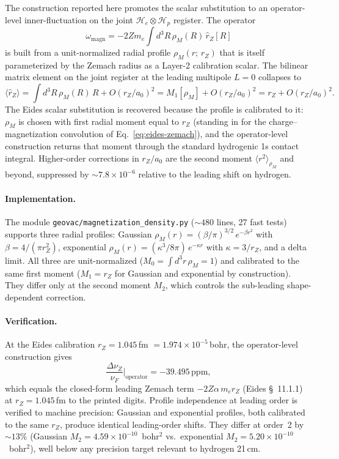 \documentclass[twocolumn,prc,amsmath,amssymb,superscriptaddress]{revtex4-2}
\begin{document}
The construction reported here promotes the scalar substitution to an
operator-level inner-fluctuation on the joint
$\mathcal{H}_e \otimes \mathcal{H}_p$ register. The operator
\begin{equation}
  \omega_{\mathrm{magn}}
  = -2 Z m_e \int d^3 R\, \rho_M(R)\, \hat r_Z[R]
\end{equation}
is built from a unit-normalized radial profile $\rho_M(r;\,r_Z)$ that
is itself parameterized by the Zemach radius as a Layer-2 calibration
scalar. The bilinear matrix element on the joint register at the
leading multipole $L = 0$ collapses to
\begin{equation}
  \langle \hat r_Z \rangle
  = \int d^3 R\,\rho_M(R)\, R + O(r_Z/a_0)^2
  = M_1[\rho_M] + O(r_Z/a_0)^2
  = r_Z + O(r_Z/a_0)^2.
\label{eq:rZ-collapse}
\end{equation}
The Eides scalar substitution is recovered because the profile is
calibrated to it:\ $\rho_M$ is chosen with first radial moment equal to
$r_Z$ (standing in for the charge--magnetization convolution of
Eq.~\eqref{eq:eides-zemach}), and the operator-level construction
returns that moment through the standard hydrogenic 1s contact
integral. Higher-order corrections in $r_Z/a_0$ are the
second moment $\langle r^2 \rangle_{\rho_M}$ and beyond, suppressed by
$\sim 7.8 \times 10^{-6}$ relative to the leading shift on hydrogen.

\paragraph{Implementation.}
The module \texttt{geovac/magnetization\_density.py} ($\sim 480$ lines,
27 fast tests) supports three radial profiles: Gaussian
$\rho_M(r) = (\beta/\pi)^{3/2}\,e^{-\beta r^2}$ with
$\beta = 4/(\pi r_Z^2)$, exponential
$\rho_M(r) = (\kappa^3/8\pi)\,e^{-\kappa r}$ with $\kappa = 3/r_Z$,
and a delta limit. All three are unit-normalized
($M_0 = \int d^3 r\, \rho_M = 1$) and calibrated to the same first
moment ($M_1 = r_Z$ for Gaussian and exponential by construction). They
differ only at the second moment $M_2$, which controls the sub-leading
shape-dependent correction.

\paragraph{Verification.}
At the Eides calibration $r_Z = 1.045$\,fm
$= 1.974 \times 10^{-5}$\,bohr, the operator-level construction gives
\begin{equation}
  \frac{\Delta\nu_Z}{\nu_F}\Big|_{\mathrm{operator}}
  = -39.495\,\mathrm{ppm},
\end{equation}
which equals the closed-form leading Zemach term
$-2Z\alpha\, m_e r_Z$ (Eides \S~11.1.1) at $r_Z = 1.045$\,fm to the
printed digits. Profile independence at
leading order is verified to machine precision: Gaussian and
exponential profiles, both calibrated to the same $r_Z$, produce
identical leading-order shifts. They differ at order~2 by $\sim 13\%$
(Gaussian $M_2 = 4.59 \times 10^{-10}$~bohr$^2$ vs.~exponential
$M_2 = 5.20 \times 10^{-10}$~bohr$^2$), well below any precision target
relevant to hydrogen 21\,cm.
\end{document}
